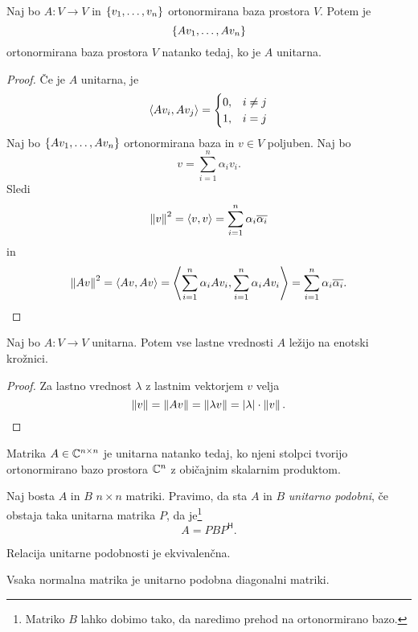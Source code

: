 \documentclass[12pt, a4paper]{article}
\begin{document}
\begin{trditev}
Naj bo $A\colon V\to V$ in $\left\{v_1,\dots,v_n\right\}$ ortonormirana baza prostora $V$. Potem je
\[
\left\{Av_1,\dots,Av_n\right\}
\]
ortonormirana baza prostora $V$ natanko tedaj, ko je $A$ unitarna.
\end{trditev}

\begin{proof}
Če je $A$ unitarna, je
\[
\left\langle Av_i,Av_j\right\rangle=\begin{cases}
0, & i\ne j
\\
1, & i = j
\end{cases}
\]
Naj bo $\left\{Av_1,\dots,Av_n\right\}$ ortonormirana baza in $v\in V$ poljuben. Naj bo
\[
v=\sum_{i=1}^n \alpha_iv_i.
\]
Sledi
\[
\left\lVert v\right\rVert^2=\left\langle v,v\right\rangle=\sum_{i=1}^n\alpha_i\overline{\alpha_i}
\]
in
\[
\left\lVert Av\right\rVert^2=\left\langle Av,Av\right\rangle=\left\langle \sum_{i=1}^n \alpha_i Av_i,\sum_{i=1}^n \alpha_i Av_i\right\rangle=\sum_{i=1}^n\alpha_i\overline{\alpha_i}.\qedhere
\]
\end{proof}

\begin{izrek}
Naj bo $A\colon V\to V$ unitarna. Potem vse lastne vrednosti $A$ ležijo na enotski krožnici.
\end{izrek}

\begin{proof}
Za lastno vrednost $\lambda$ z lastnim vektorjem $v$ velja
\[
\left\lVert v\right\rVert=\left\lVert Av\right\rVert=\left\lVert \lambda v\right\rVert=\left\lvert \lambda\right\rvert\cdot\left\lVert v\right\rVert.\qedhere
\]
\end{proof}

\begin{trditev}
Matrika $A\in\mathbb{C}^{n\times n}$ je unitarna natanko tedaj, ko njeni stolpci tvorijo ortonormirano bazo prostora $\mathbb{C}^n$ z običajnim skalarnim produktom.
\end{trditev}

\obvs

\begin{definicija}
Naj bosta $A$ in $B$ $n\times n$ matriki. Pravimo, da sta $A$ in $B$ \emph{unitarno podobni}, če obstaja taka unitarna matrika $P$, da je\footnote{Matriko $B$ lahko dobimo tako, da naredimo prehod na ortonormirano bazo.}
\[
A=PBP^\mathsf{H}.
\]
\end{definicija}

\begin{opomba}
Relacija unitarne podobnosti je ekvivalenčna.
\end{opomba}

\begin{posledica}
Vsaka normalna matrika je unitarno podobna diagonalni matriki.
\end{posledica}
\end{document}
